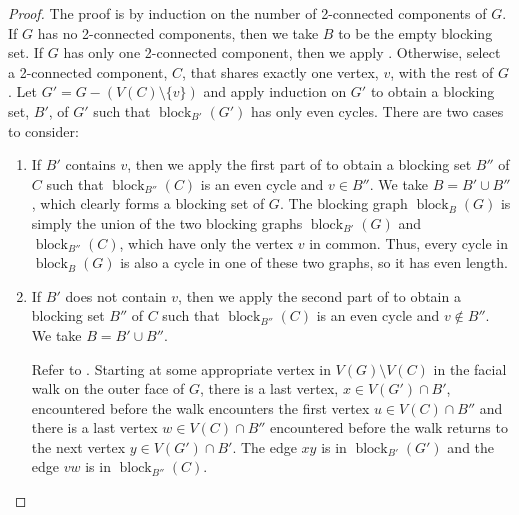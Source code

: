 \documentclass{cccg16}
\DeclareMathOperator{\block}{block}
\begin{document}
\begin{proof}
  The proof is by induction on the number of 2-connected components
  of $G$.  If $G$ has no 2-connected components, then we take $B$ to be
  the empty blocking set.  If $G$ has only one 2-connected component,
  then we apply .
  Otherwise, select a 2-connected component, $C$, that
  shares exactly one vertex, $v$, with the rest of $G$.  Let
  $G'=G-(V(C)\setminus\{v\})$ and apply induction on $G'$
  to obtain a blocking set, $B'$, of $G'$ such that $\block_{B'}(G')$
  has only even cycles.  There are two cases to consider:
  \begin{enumerate}
    \item If $B'$ contains $v$, then we apply the first part of
     to obtain a blocking set $B''$ of $C$
    such that $\block_{B''}(C)$ is an even cycle and $v\in B''$.  We take
    $B=B'\cup B''$, which clearly forms a blocking set of $G$.  
    The blocking graph $\block_B(G)$ is simply the union of the
    two blocking graphs $\block_{B'}(G)$ and $\block_{B''}(C)$, which have
    only the vertex $v$ in common.  Thus, every cycle in $\block_B(G)$
    is also a cycle in one of these two graphs, so it has even length.

    \item If $B'$ does not contain $v$, then we apply the second part
    of  to obtain a blocking set $B''$ of $C$
    such that $\block_{B''}(C)$ is an even cycle and $v\not\in B''$.
    We take $B=B'\cup B''$.

    Refer to .  
    Starting at some appropriate vertex in $V(G)\setminus V(C)$
    in the facial walk on the outer face of $G$, there is a last vertex,
    $x\in V(G')\cap B'$, encountered before the walk encounters the first
    vertex $u\in V(C)\cap B''$ and there is a last vertex $w\in V(C)\cap
    B''$ encountered before the walk returns to the next vertex $y\in
    V(G')\cap B'$.  The edge $xy$ is in $\block_{B'}(G')$ and the edge
    $vw$ is in $\block_{B''}(C)$.


\end{enumerate}
\end{proof}
\end{document}
